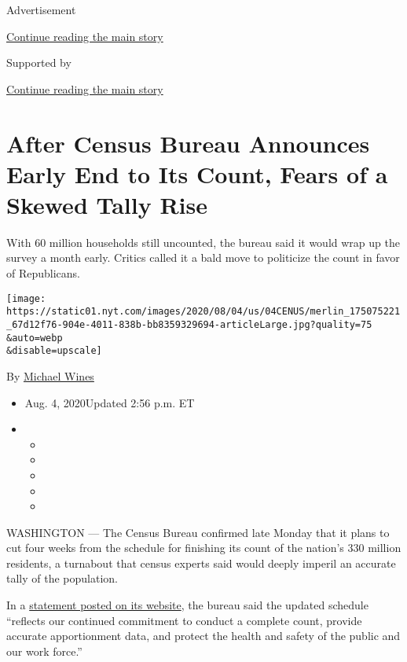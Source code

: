 Advertisement

\protect\hyperlink{after-top}{Continue reading the main story}

Supported by

\protect\hyperlink{after-sponsor}{Continue reading the main story}

\hypertarget{after-census-bureau-announces-early-end-to-its-count-fears-of-a-skewed-tally-rise}{%
\section{After Census Bureau Announces Early End to Its Count, Fears of
a Skewed Tally
Rise}\label{after-census-bureau-announces-early-end-to-its-count-fears-of-a-skewed-tally-rise}}

With 60 million households still uncounted, the bureau said it would
wrap up the survey a month early. Critics called it a bald move to
politicize the count in favor of Republicans.

\texttt{[image: https://static01.nyt.com/images/2020/08/04/us/04CENUS/merlin\_175075221\_67d12f76-904e-4011-838b-bb8359329694-articleLarge.jpg?quality=75\\\&auto=webp\\\&disable=upscale]}

By \href{https://www.nytimes.com/by/michael-wines}{Michael Wines}

\begin{itemize}
\item
  Aug. 4, 2020Updated 2:56 p.m. ET
\item
  \begin{itemize}
  \item
  \item
  \item
  \item
  \item
  \end{itemize}
\end{itemize}

WASHINGTON --- The Census Bureau confirmed late Monday that it plans to
cut four weeks from the schedule for finishing its count of the nation's
330 million residents, a turnabout that census experts said would deeply
imperil an accurate tally of the population.

In a
\href{https://www.census.gov/newsroom/press-releases/2020/delivering-complete-accurate-count.html}{statement
posted on its website}, the bureau said the updated schedule ``reflects
our continued commitment to conduct a complete count, provide accurate
apportionment data, and protect the health and safety of the public and
our work force.''

